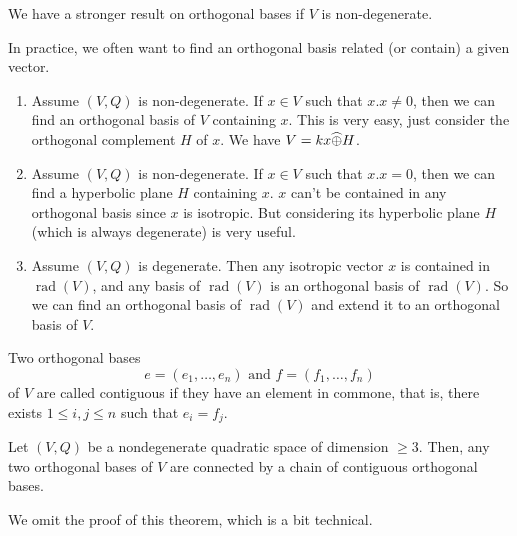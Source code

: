 \documentclass[15pt]{scrartcl}
\newcommand{\rad}{\operatorname{rad}}
\newcommand{\po}{\wh{\oplus}}
\begin{document}
We have a stronger result on orthogonal bases if $V$ is non-degenerate. 
\begin{remark}
    In practice, we often want to find an orthogonal basis related (or contain) a given vector. 
    \begin{enumerate}
        \item Assume $(V,Q)$ is non-degenerate. If $x\in V$ such that $x.x\neq 0$, then we can find an orthogonal basis of $V$ containing $x$. This is very easy, just consider the orthogonal complement $H$ of $x$. We have $V=kx\po H$. 
        \item Assume $(V,Q)$ is non-degenerate. If $x\in V$ such that $x.x=0$, then we can find a hyperbolic plane $H$ containing $x$. $x$ can't be contained in any orthogonal basis since $x$ is isotropic. But considering its hyperbolic plane $H$ (which is always degenerate) is very useful. 
        \item Assume $(V,Q)$ is degenerate. Then any isotropic vector $x$ is contained in $\rad(V)$, and any basis of $\rad(V)$ is an orthogonal basis of $\rad(V)$. So we can find an orthogonal basis of $\rad(V)$ and extend it to an orthogonal basis of $V$.
    \end{enumerate}
    
\end{remark}
\begin{definition}
    Two orthogonal bases 
    \[e=(e_1,\ldots,e_n)\text{ and }f=(f_1,\ldots,f_n)\] of $V$ are called contiguous if they have an element in commone, that is, there exists $1\leq i,j \leq n$ such that $e_i=f_j$.
\end{definition}
\begin{theorem}
    Let $(V,Q)$ be a nondegenerate quadratic space of dimension $\geq 3$. Then, any two orthogonal bases of $V$ are connected by a chain of contiguous orthogonal bases.
\end{theorem}
We omit the proof of this theorem, which is a bit technical. 
\end{document}
